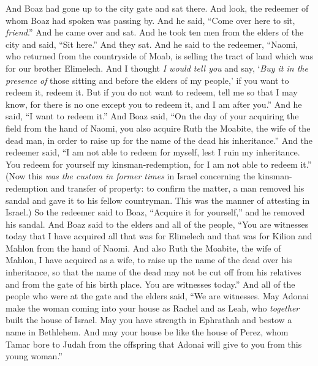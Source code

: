 \begin{biblechapter} %
 And Boaz had gone up to the city gate and sat there. And look, the redeemer of whom Boaz had spoken was passing by. And he said, “Come over here to sit, \textit{friend}.” And he came over and sat.
\verse And he took ten men from the elders of the city and said, “Sit here.” And they sat.
\verse And he said to the redeemer, “Naomi, who returned from the countryside of Moab, is selling the tract of land which was for our brother Elimelech.
\verse And I thought \textit{I would tell you} and say, ‘\textit{Buy it in the presence of} those sitting and before the elders of my people,’ if you want to redeem it, redeem it. But if you do not want to redeem, tell me so that I may know, for there is no one except you to redeem it, and I am after you.” And he said, “I want to redeem it.”
\verse And Boaz said, “On the day of your acquiring the field from the hand of Naomi, you also acquire Ruth the Moabite, the wife of the dead man, in order to raise up for the name of the dead his inheritance.”
\verse And the redeemer said, “I am not able to redeem for myself, lest I ruin my inheritance. You redeem for yourself my kinsman-redemption, for I am not able to redeem it.”
\verse (Now this \textit{was the custom in former times} in Israel concerning the kinsman-redemption and transfer of property: to confirm the matter, a man removed his sandal and gave it to his fellow countryman. This was the manner of attesting in Israel.)
\verse So the redeemer said to Boaz, “Acquire it for yourself,” and he removed his sandal.
\verse And Boaz said to the elders and all of the people, “You are witnesses today that I have acquired all that was for Elimelech and that was for Kilion and Mahlon from the hand of Naomi.
\verse And also Ruth the Moabite, the wife of Mahlon, I have acquired as a wife, to raise up the name of the dead over his inheritance, so that the name of the dead may not be cut off from his relatives and from the gate of his birth place. You are witnesses today.”
\verse And all of the people who were at the gate and the elders said, “We are witnesses. May Adonai make the woman coming into your house as Rachel and as Leah, who \textit{together} built the house of Israel. May you have strength in Ephrathah and bestow a name in Bethlehem.
\verse And may your house be like the house of Perez, whom Tamar bore to Judah from the offspring that Adonai will give to you from this young woman.”

\end{biblechapter}
